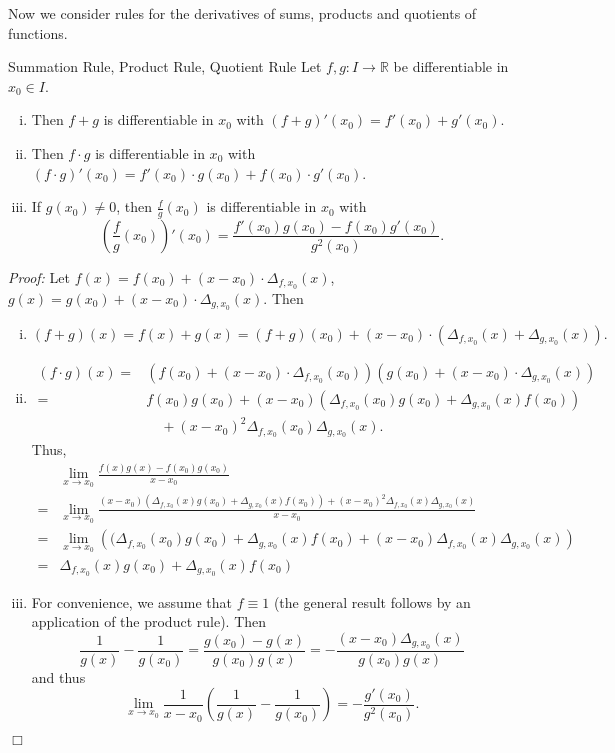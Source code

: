 

Now we consider rules for the derivatives of sums, products and quotients of functions.
\begin{Theorem}{Summation Rule{,} Product Rule{,} Quotient Rule}
    Let $f,g: I\to\mathbb{R}$ be differentiable in $x_0\in I$.
\begin{enumerate}[(i)]
\item Then $f+g$ is differentiable in $x_0$ with $(f+g)'(x_0)=f'(x_0)+g'(x_0)$.
\item Then $f\cdot g$ is differentiable in $x_0$ with $(f\cdot g)'(x_0)=f'(x_0)\cdot g(x_0)+f(x_0)\cdot g'(x_0)$.
\item If $g(x_0)\neq0$, then $\frac{f}g(x_0)$ is differentiable in $x_0$ with
\[\left(\frac{f}g(x_0)\right)'(x_0)=\frac{f'(x_0)g(x_0)-f(x_0)g'(x_0)}{g^2(x_0)}.\]
\end{enumerate}
\end{Theorem}
{\em Proof:} Let $f(x)=f(x_0)+(x-x_0)\cdot\Delta_{f,x_0}(x)$, $g(x)=g(x_0)+(x-x_0)\cdot\Delta_{g,x_0}(x)$. Then
\begin{enumerate}[(i)]
\item \[(f+g)(x)=f(x)+g(x)=(f+g)(x_0)+(x-x_0)\cdot(\Delta_{f,x_0}(x)+\Delta_{g,x_0}(x)).\]
\item
\[
\begin{aligned}
(f\cdot g)(x)=&
(f(x_0)+(x-x_0)\cdot\Delta_{f,x_0}(x_0))(g(x_0)+(x-x_0)\cdot\Delta_{g,x_0}(x))\\
=&f(x_0)g(x_0)+(x-x_0)(\Delta_{f,x_0}(x_0)g(x_0)+\Delta_{g,x_0}(x)f(x_0))\\&\quad+(x-x_0)^2\Delta_{f,x_0}(x_0)\Delta_{g,x_0}(x)
.\end{aligned}\]
Thus,
\[
\begin{aligned}
&\lim_{x\to x_0}\frac{f(x)g(x)-f(x_0)g(x_0)}{x-x_0}\\
=&\lim_{x\to x_0}\frac{(x-x_0)(\Delta_{f,x_0}(x)g(x_0)+\Delta_{g,x_0}(x)f(x_0))+(x-x_0)^2\Delta_{f,x_0}(x)\Delta_{g,x_0}(x)}{x-x_0}\\
=&\lim_{x\to x_0}\left((\Delta_{f,x_0}(x_0)g(x_0)+\Delta_{g,x_0}(x)f(x_0)+(x-x_0)\Delta_{f,x_0}(x)\Delta_{g,x_0}(x)\right)\\
=&\Delta_{f,x_0}(x)g(x_0)+\Delta_{g,x_0}(x)f(x_0)
\end{aligned}
\]
\item For convenience, we assume that $f\equiv1$ (the general result follows by an application of the product rule). Then
\[\frac1{g(x)}-\frac1{g(x_0)}=\frac{g(x_0)-g(x)}{g(x_0)g(x)}=-\frac{(x-x_0)\Delta_{g,x_0}(x)}{g(x_0)g(x)}\]
and thus
\[\lim_{x\to x_0}\frac1{x-x_0}\left(\frac1{g(x)}-\frac1{g(x_0)}\right)=-\frac{g'(x_0)}{g^2(x_0)}.\]
\end{enumerate}
$\Box$


